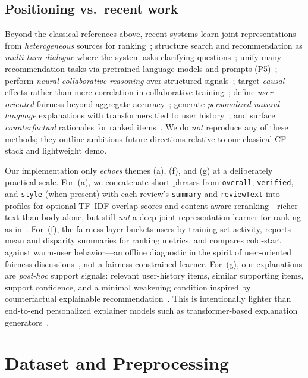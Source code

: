 \documentclass[sigconf,nonacm]{acmart}
\begin{document}
\subsection{Positioning vs.\ recent work}
Beyond the classical references above, recent systems learn joint representations from \emph{heterogeneous} sources for ranking~\cite{zhang2017heterogeneous}; structure search and recommendation as \emph{multi-turn dialogue} where the system asks clarifying questions~\cite{zhang2018conversational}; unify many recommendation tasks via pretrained language models and prompts (P5)~\cite{geng2022p5}; perform \emph{neural collaborative reasoning} over structured signals~\cite{chen2020neuralreasoning}; target \emph{causal} effects rather than mere correlation in collaborative training~\cite{xu2021causal}; define \emph{user-oriented} fairness beyond aggregate accuracy~\cite{li2021userfairness}; generate \emph{personalized natural-language} explanations with transformers tied to user history~\cite{li2021pextransformer}; and surface \emph{counterfactual} rationales for ranked items~\cite{tan2021counterfactual}. We do \emph{not} reproduce any of these methods; they outline ambitious future directions relative to our classical CF stack and lightweight demo.

Our implementation only \emph{echoes} themes (a), (f), and (g) at a deliberately practical scale. For~(a), we concatenate short phrases from \texttt{overall}, \texttt{verified}, and \texttt{style} (when present) with each review's \texttt{summary} and \texttt{reviewText} into profiles for optional TF--IDF overlap scores and content-aware reranking---richer text than body alone, but still \emph{not} a deep joint representation learner for ranking as in~\cite{zhang2017heterogeneous}. For~(f), the fairness layer buckets users by training-set activity, reports mean and disparity summaries for ranking metrics, and compares cold-start against warm-user behavior---an offline diagnostic in the spirit of user-oriented fairness discussions~\cite{li2021userfairness}, not a fairness-constrained learner. For~(g), our explanations are \emph{post-hoc} support signals: relevant user-history items, similar supporting items, support confidence, and a minimal weakening condition inspired by counterfactual explainable recommendation~\cite{tan2021counterfactual}. This is intentionally lighter than end-to-end personalized explainer models such as transformer-based explanation generators~\cite{li2021pextransformer}.

\section{Dataset and Preprocessing}
\end{document}
